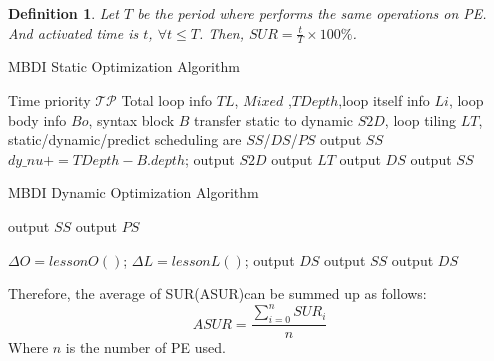 \documentclass[10pt, conference, compsocconf]{IEEEtran}
\newtheorem{defn}{Definition}
\begin{document}
\begin{defn}Let $T$ be the period where performs the same operations on PE. And activated time is $t$, $\forall t\leq T$. Then, $SUR=\frac{t}{T}\times100\%$.
\end{defn}
\begin{algorithm}[H]
	\caption{MBDI Static Optimization Algorithm}
	\label{algo-static}
	
	\begin{algorithmic}[1]
		\REQUIRE Time priority $\mathcal{TP}$
		\INPUT Total loop info $TL$, $Mixed$ ,$TDepth$,loop itself info $Li$, loop body info $Bo$, syntax block $B$
		\OUTPUT transfer static to dynamic $S2D$, loop tiling $LT$, static/dynamic/predict scheduling are $SS$/$DS$/$PS$
		\STATE output $SS$
		\ELSE
		\STATE $dy\_nu += TDepth - B.depth$;
		\STATE output $S2D$
		\ENDWHILE
		\ELSE
		\STATE output $LT$
		\ENDWHILE
		\ENDIF						
		\STATE output $DS$
		\ELSE
		\STATE output $SS$						
		\ENDIF
		\ENDIF
		\ENDIF
		\ENDWHILE	
	\end{algorithmic}	
\end{algorithm}
\begin{algorithm}[H]
	\caption{MBDI Dynamic Optimization Algorithm}
	\label{algo-dynamic}
	\begin{algorithmic}[1]
		\STATE output $SS$
		\STATE output $PS$
		
		\ELSE
		\STATE $\Delta{O} = lessonO()$;
		\STATE $\Delta{L} = lessonL()$;
		\STATE output $DS$
		\ELSE
		\STATE output $SS$
		\ENDIF
		\ELSE
		\STATE output $DS$
		\ENDIF
		\ENDIF
		
		\ENDWHILE
	\end{algorithmic}
\end{algorithm}
Therefore, the average of SUR(ASUR)can be summed up as follows:
\begin{equation}\label{eq-ASUR}
	ASUR = \frac{\sum_{i=0}^{n}SUR_i}{n}
\end{equation}
Where $n$ is the number of PE used.
\end{document}
